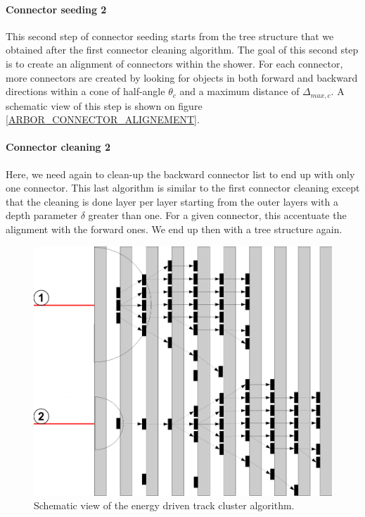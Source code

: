 \documentclass[cits]{JINST}
\begin{document}
\paragraph*{Connector seeding 2} This second step of connector seeding starts from the tree structure that we obtained after the first connector cleaning algorithm. The goal of this second step is to create an alignment of connectors within the shower. For each connector, more connectors are created by looking for objects in both forward and backward directions within a cone of half-angle $\theta_c$ and a maximum distance of $\Delta_{max,c}$. A schematic view of this step is shown on figure \ref{ARBOR_CONNECTOR_ALIGNEMENT}.

\paragraph*{Connector cleaning 2} Here, we need again to clean-up the backward connector list to end up with only one connector. This last algorithm is similar to the first connector cleaning except that the cleaning is done layer per layer starting from the outer layers with a depth parameter $\delta$ greater than one. For a given connector, this accentuate the alignment with the forward ones. We end up then with a tree structure again.

\begin{figure}
  \vspace{-20pt}
  \begin{center}
    \includegraphics[width=\linewidth]{EnergyDrivenTrackClusterAssociation.pdf}
  \end{center}
  \caption{\label{ARBOR_ENERGY_DRIVEN_TRACK_CLUSTER_ASSOCIATION} Schematic view of the energy driven track cluster algorithm.}
  \vspace{-30pt}
\end{figure}
\end{document}
